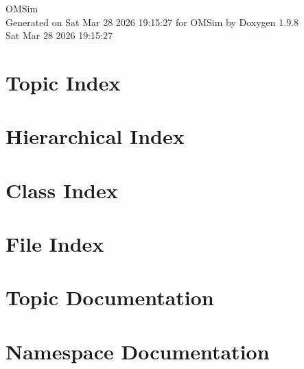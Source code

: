 \documentclass[twoside]{book}
\newcommand{\+}{\discretionary{\mbox{\scriptsize$\hookleftarrow$}}{}{}}
\newcommand{\clearemptydoublepage}{%
    \newpage{\pagestyle{empty}\cleardoublepage}%
  }
\begin{document}
  \raggedbottom
    \hypersetup{pageanchor=false,
                bookmarksnumbered=true,
                pdfencoding=unicode
               }
  \begin{titlepage}
  \vspace*{7cm}
  \begin{center}%
  {\Large OMSim}\\
  \vspace*{1cm}
  {\large Generated on Sat Mar 28 2026 19\+:15\+:27 for OMSim by Doxygen 1.9.8}\\
    \vspace*{0.5cm}
    {\small Sat Mar 28 2026 19:15:27}
  \end{center}
  \end{titlepage}
  \clearemptydoublepage
  \tableofcontents
  \clearemptydoublepage
  \hypersetup{pageanchor=true}









\chapter{Topic Index}

\chapter{Hierarchical Index}

\chapter{Class Index}

\chapter{File Index}

\chapter{Topic Documentation}




\chapter{Namespace Documentation}



\end{document}
